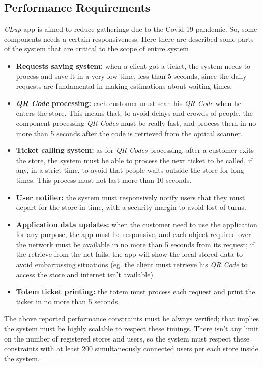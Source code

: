 \documentclass{article}
\begin{document}
	\subsection{Performance Requirements}
	\emph{CLup} app is aimed to reduce gatherings due to the Covid-19 pandemic. So, some components needs a certain responsiveness. Here there are described some parts of the system that are critical to the scope of entire system
	\begin{itemize}
		\item {\bfseries Requests saving system:} when a client got a ticket, the system needs to process and save it in a very low time, less than 5 seconds,  since the daily requests are fundamental in making estimations about waiting times.
		\item {\bfseries \emph{QR Code} processing:} each customer must scan his \emph{QR Code} when he enters the store. This means that, to avoid delays and crowds of people, the component processing \emph{QR Codes} must be really fast, and process them in no more than 5 seconds after the code is retrieved from the optical scanner.
		\item {\bfseries Ticket calling system:} as for \emph{QR Codes} processing, after a customer exits the store, the system must be able to process the next ticket to be called, if any, in a strict time, to avoid that people waits outside the store for long times. This process must not last more than 10 seconds.
		\item {\bfseries User notifier:} the system must responsively notify users that they must depart for the store in time, with a security margin to avoid lost of turns. 
		\item{\bfseries Application data updates:} when the customer need to use the application for any purpose, the app must be responsive, and each object required over the network must be available in no more than 5 seconds from its request; if the retrieve from the net fails, the app will show the local stored data to avoid embarrassing situations  (eg. the client must retrieve his \emph{QR Code} to access the store and internet isn't available) 
		\item{\bfseries Totem ticket printing: } the totem must process each request and print the ticket in no more than 5 seconds.
	\end{itemize} 
The above reported performance constraints must be always verified; that implies the system must be highly scalable to respect these timings. There isn't any limit on the number of registered stores and users, so the system must respect these constraints with at least 200 simultaneously connected users per each store inside the system.
\end{document}
